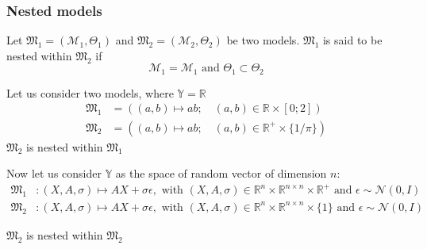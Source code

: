 \documentclass[a4paper,11pt]{article}
\newcommand{\Yspace}{\mathbb{Y}}
\theoremstyle{defi}
\numberwithin{thmCounter}{section}
\begin{document}
\subsubsection{Nested models}
\begin{definition}
  Let $\mathfrak{M}_1=(\mathcal{M}_1, \Theta_1)$ and $\mathfrak{M}_2=(\mathcal{M}_2, \Theta_2)$ be two models.
$\mathfrak{M}_1$ is said to be nested within $\mathfrak{M}_2$ if
\begin{equation*}
  \mathcal{M}_1 = \mathcal{M}_1 \text{ and } \Theta_1 \subset \Theta_2
\end{equation*}
\end{definition}
\begin{example}
  Let us consider two models, where $\Yspace = \mathbb{R}$
  \begin{align*}
    \mathfrak{M}_1 &= \left((a,b) \mapsto ab;\quad (a,b) \in \mathbb{R} \times [0;2]\right) \\
   \mathfrak{M}_2 &= \left((a,b) \mapsto ab;\quad (a,b) \in \mathbb{R}^+ \times \{1/\pi\}\right)
  \end{align*}
$\mathfrak{M}_2$ is nested within $\mathfrak{M}_1$
\end{example}
\begin{example}
  Now let us consider $\Yspace$ as the space of random vector of dimension $n$:
  \begin{align*}
    \mathfrak{M}_1 &: (X, A, \sigma) \mapsto AX + \sigma\epsilon, \text{ with } (X, A, \sigma)\in\mathbb{R}^n \times \mathbb{R}^{n\times n} \times \mathbb{R}^+ \text{ and } \epsilon \sim \mathcal{N}(0, I) \\
    \mathfrak{M}_2 &: (X, A, \sigma) \mapsto AX + \sigma\epsilon, \text{ with } (X, A, \sigma)\in\mathbb{R}^n \times \mathbb{R}^{n\times n} \times \{1\} \text{ and } \epsilon \sim \mathcal{N}(0, I)
  \end{align*}
\end{example}
$\mathfrak{M}_2$ is nested within $\mathfrak{M}_2$
\end{document}
